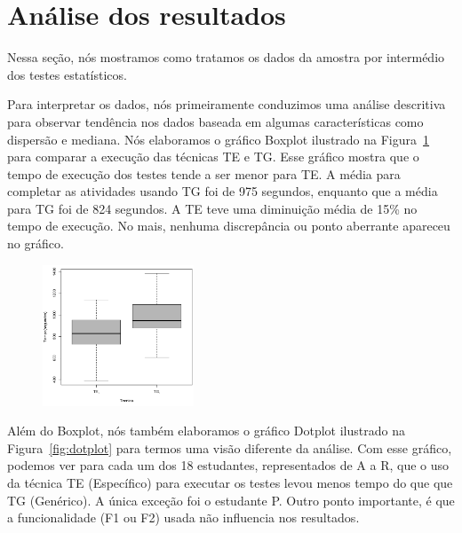 \section{An\'alise dos resultados}
\label{sec:resultados}


Nessa seção, nós mostramos como tratamos os dados da amostra por intermédio dos testes estatísticos. 

Para interpretar os dados, nós primeiramente conduzimos uma análise descritiva
para observar tendência nos dados baseada em algumas características como
dispersão e mediana. Nós elaboramos o gráfico Boxplot ilustrado na
Figura~\ref{fig:boxplot} para comparar a execução das técnicas TE e TG. Esse
gráfico mostra que o tempo de execução dos testes tende a ser menor para TE. A
média para completar as atividades usando TG foi de 975 segundos, enquanto que a
média para TG foi de 824 segundos. A TE teve uma diminuição média de 15\% no
tempo de execução. No mais, nenhuma discrepância ou ponto aberrante apareceu no
gráfico.

\begin{figure}[t]
    \centering
    \includegraphics[width=0.4\textwidth]{images/boxplot.png}
    \caption{}
    \label{fig:boxplot}
\end{figure}

Além do Boxplot, nós também elaboramos o gráfico Dotplot ilustrado na
Figura~\ref{fig:dotplot} para termos uma visão diferente da análise. Com esse
gráfico, podemos ver para cada um dos 18 estudantes, representados de A a R, que
o uso da técnica TE (Específico) para executar os testes levou menos tempo do
que que TG (Genérico). A única exceção foi o estudante P. Outro ponto
importante, é que a funcionalidade (F1 ou F2) usada não influencia nos
resultados.

